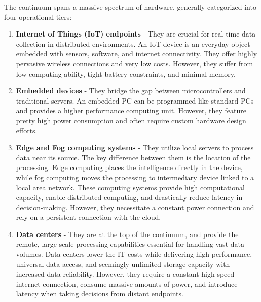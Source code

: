 The continuum spans a massive spectrum of hardware, generally categorized into four operational tiers:
\begin{enumerate}
    \item \textbf{Internet of Things (IoT) endpoints} - They are crucial for real-time data collection in distributed environments. An IoT device is an everyday object embedded with sensors, software, and internet connectivity. They offer highly pervasive wireless connections and very low costs. However, they suffer from low computing ability, tight battery constraints, and minimal memory.
    \item \textbf{Embedded devices} - They bridge the gap between microcontrollers and traditional servers. An embedded PC can be programmed like standard PCs and provides a higher performance computing unit. However, they feature pretty high power consumption and often require custom hardware design efforts.
    \item \textbf{Edge and Fog computing systems} - They utilize local servers to process data near its source. The key difference between them is the location of the processing. Edge computing places the intelligence directly in the device, while fog computing moves the processing to intermediary device linked to a local area network. These computing systems provide high computational capacity, enable distributed computing, and drastically reduce latency in decision-making. However, they necessitate a constant power connection and rely on a persistent connection with the cloud.
    \item \textbf{Data centers} - They are at the top of the continuum, and provide the remote, large-scale processing capabilities essential for handling vast data volumes. Data centers lower the IT costs while delivering high-performance, universal data access, and seemingly unlimited storage capacity with increased data reliability. However, they require a constant high-speed internet connection, consume massive amounts of power, and introduce latency when taking decisions from distant endpoints.
\end{enumerate}
